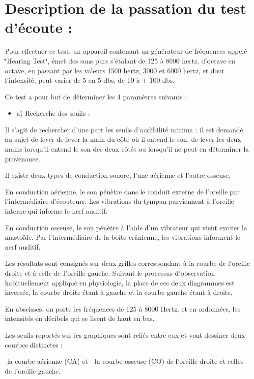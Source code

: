 \documentclass[12pt,french]{report}
\makeatletter
\let\SF@@footnote\footnote
\def\footnote{\ifx\protect\@typeset@protect
    \expandafter\SF@@footnote
  \else
    \expandafter\SF@gobble@opt
  \fi
}
\edef\SF@gobble@opt{\noexpand\protect
  \expandafter\noexpand\csname SF@gobble@opt \endcsname}
\makeatother
\begin{document}
\section{Description de la passation du test d'écoute :}

Pour effectuer ce test, un appareil contenant un générateur de fréquences
appelé \char`\"{}Hearing Test\char`\"{}, émet des sons purs s'étalant
de 125 à 8000 hertz, d'octave en octave, en passant par les valeurs
1500 hertz, 3000 et 6000 hertz, et dont l'intensité, peut varier de
5 en 5 dbs, de 10 à + 100 dbs. 

Ce test a pour but de déterminer les 4 paramètres suivants : 
\begin{itemize}
\item a) Recherche des seuils :
\end{itemize}
Il s'agit de rechercher d'une part les seuils d\textquoteright audibilité
minima : il est demandé au sujet de lever de lever la main du côté
où il entend le son, de lever les deux mains lorsqu'il entend le son
des deux côtés ou lorsqu'il ne peut en déterminer la provenance.

Il existe deux types de conduction sonore, l'une aérienne et l'autre
osseuse.

En conduction aérienne, le son pénètre dans le conduit externe de
l'oreille par l'intermédiaire d'écouteurs. Les vibrations du tympan
parviennent à l'oreille interne qui informe le nerf auditif.

En conduction osseuse, le son pénètre à l\textquoteright aide d'un
vibrateur qui vient exciter la mastoïde. Par l'intermédiaire de la
boîte crânienne, les vibrations informent le nerf auditif.

Les résultats sont consignés sur deux grilles correspondant à la courbe
de l'oreille droite et à celle de I\textquoteright oreille gauche.
\footnote{Suivant le processus d'observation habituellement appliqué en physiologie,
la place de ces deux diagrammes est inversée, la courbe droite étant
à gauche et la courbe gauche étant à droite. }

En abscisses, on porte les fréquences de 125 à 8000 Hertz, et en ordonnées,
les intensités en décibels qui se lisent de haut en bas. 

Les seuils reportés sur les graphiques sont reliés entre eux et vont
dessiner deux courbes distinctes : 

-la courbe aérienne (CA) et - la courbe osseuse (CO) de l'oreille
droite et celles de l'oreille gauche.
\end{document}
